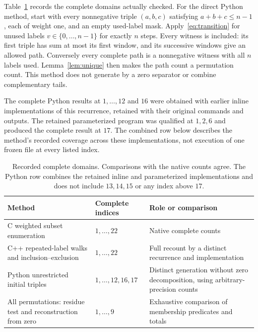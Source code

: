 \documentclass[11pt]{article}
\theoremstyle{definition}
\theoremstyle{remark}
\begin{document}
Table~\ref{tab:validation} records the complete domains actually checked.
For the direct Python method, start with every nonnegative triple
$(a,b,c)$ satisfying $a+b+c\leq n-1$, each of weight one, and an empty
used-label mask. Apply~\eqref{eq:transition} for unused labels
$v\in\{0,\ldots,n-1\}$ for exactly $n$ steps. Every witness is included:
its first triple has sum at most its first window, and its successive
windows give an allowed path. Conversely every complete path is a
nonnegative witness with all $n$ labels used. Lemma~\ref{lem:unique}
then makes the path count a permutation count. This method does not
generate by a zero separator or combine complementary tails.

The complete Python results at $1,\ldots,12$ and $16$ were obtained with
earlier inline implementations of this recurrence, retained with their
original commands and outputs. The retained parameterized program was
qualified at $1,2,6$ and produced the complete result at $17$.
The combined row below describes the method's recorded coverage across
these implementations, not execution of one frozen file at every listed index.

\begin{table}[htbp]
\centering
\small
\begin{tabular}{@{}>{\raggedright\arraybackslash}p{}>{\raggedright\arraybackslash}p{}>{\raggedright\arraybackslash}p{}@{}}
\toprule
Method & Complete indices & Role or comparison \\
\midrule
C weighted subset enumeration & $1,\ldots,22$ & Native complete counts \\
C++ repeated-label walks and inclusion--exclusion & $1,\ldots,22$ & Full recount by a distinct recurrence and implementation \\
Python unrestricted initial triples & $1,\ldots,12,16,17$ & Distinct generation without zero decomposition, using arbitrary-precision counts \\
All permutations: residue test and reconstruction from zero & $1,\ldots,9$ & Exhaustive comparison of membership predicates and totals \\
\bottomrule
\end{tabular}
\caption{Recorded complete domains. Comparisons with the native counts agree.
The Python row combines the retained inline and parameterized implementations and
does not include $13,14,15$ or any index above $17$.}
\label{tab:validation}
\end{table}
\end{document}

